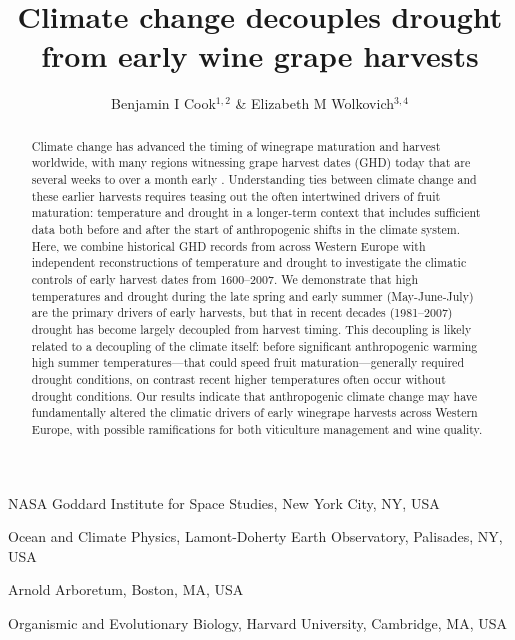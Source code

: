 \documentclass[final]{nature}
\title{Climate change decouples drought from early wine grape harvests}
\author{Benjamin I Cook$^{1,2}$ \& Elizabeth M Wolkovich$^{3,4}$}
\begin{document}
\maketitle

\begin{affiliations}
 \item NASA Goddard Institute for Space Studies, New York City, NY, USA
 \item Ocean and Climate Physics, Lamont-Doherty Earth Observatory, Palisades, NY, USA
 \item Arnold Arboretum, Boston, MA, USA
 \item Organismic and Evolutionary Biology, Harvard University, Cambridge, MA, USA
\end{affiliations}

\begin{abstract}
Climate change has advanced the timing of winegrape maturation and harvest worldwide, with many regions witnessing grape harvest dates (GHD) today that are several weeks to over a month early \cite{Duchene:2005bd,Seguin2005,webb2011}. Understanding ties between climate change and these earlier harvests requires teasing out the often intertwined drivers of fruit maturation: temperature and drought in a longer-term context that includes sufficient data both before and after the start of anthropogenic shifts in the climate system. Here, we combine historical GHD records from across Western Europe\cite{Daux2012} with independent reconstructions of temperature\cite{Luterbacher2004} and drought\cite{CookOWDA2015,Pauling2006} to investigate the climatic controls of early harvest dates from 1600--2007. We demonstrate that high temperatures and drought during the late spring and early summer (May-June-July) are the primary drivers of early harvests, but that in recent decades (1981--2007) drought has become largely decoupled from harvest timing. This decoupling is likely related to a decoupling of the climate itself: before significant anthropogenic warming high summer temperatures---that could speed fruit maturation---generally required drought conditions, on contrast recent higher temperatures often occur without drought conditions. Our results indicate that anthropogenic climate change may have fundamentally altered the climatic drivers of early winegrape harvests across Western Europe, with possible ramifications for both viticulture management and wine quality. %
\end{abstract}
\end{document}
